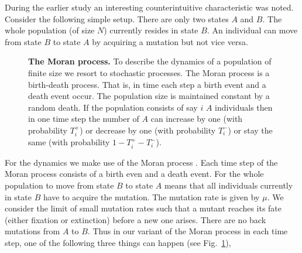 \documentclass[oneside,11pt,a4paper]{book}
\begin{document}
During the earlier study an interesting counterintuitive characteristic was noted.
Consider the following simple setup.
There are only two states $A$ and $B$.
The whole population (of size $N$) currently resides in state $B$.
An individual can move from state $B$ to state $A$ by acquiring a mutation but not vice versa.
%
\begin{figure}[!h]
  \begin{center}
  \end{center}
  \caption{
  \label{fig:moran}
  \textbf{The Moran process.}
\small{ To describe the dynamics of a population of finite size we resort to stochastic processes.
 The Moran process is a birth-death process. 
 That is, in time each step a birth event and a death event occur.
 The population size is maintained constant by a random death.
 If the population consists of say $i$ $A$ individuals then in one time step the number of $A$ can increase by one (with probability $T_i^+$) or decrease by one (with probability $T_i^-$) or stay the same (with probability $1-T_i^+ -T_i^-$).}
  }
\end{figure}
%
For the dynamics we make use of the Moran process \citep{moran:1962ef}.
Each time step of the Moran process consists of a birth even and a death event.
For the whole population to move from state $B$ to state $A$ means that all individuals currently in state $B$ have to acquire the mutation.
The mutation rate is given by $\mu$.
We consider the limit of small mutation rates such that a mutant reaches its fate (either fixation or extinction) before a new one arises.
There are no back mutations from $A$ to $B$.
Thus in our variant of the Moran process in each time step, one of the following three things can happen (see Fig.\ \ref{fig:moran}),
\end{document}
